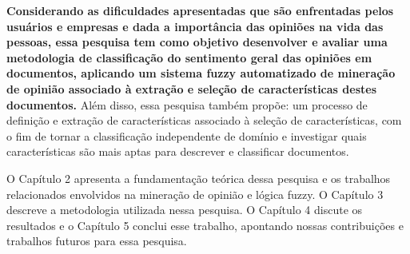 \documentclass[template.tex]{subfiles}
\begin{document}

\textbf{Considerando as dificuldades apresentadas que são enfrentadas pelos usuários e empresas e dada a importância das opiniões na vida das pessoas, essa pesquisa tem como objetivo desenvolver e avaliar uma metodologia de classificação do sentimento geral das opiniões em documentos, aplicando um sistema fuzzy automatizado de mineração de opinião associado à extração e seleção de características destes documentos.} Além disso, essa pesquisa também propõe: um processo de definição e extração de características associado à seleção de características, com o fim de tornar a classificação independente de domínio e investigar quais características são mais aptas para descrever e classificar documentos.


O Capítulo 2 apresenta a fundamentação teórica dessa pesquisa e os trabalhos relacionados envolvidos na mineração de opinião e lógica fuzzy. O Capítulo 3 descreve a metodologia utilizada nessa pesquisa. O Capítulo 4 discute os resultados e o Capítulo 5 conclui esse trabalho, apontando nossas contribuições e trabalhos futuros para essa pesquisa.


\end{document}
